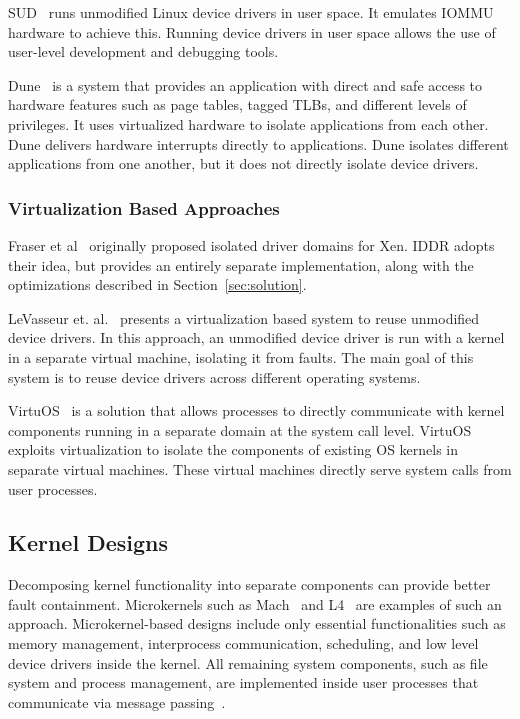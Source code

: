 SUD~\cite{Boyd-Wickizer+:atc2010} runs unmodified Linux device drivers
in user space. It emulates IOMMU hardware to achieve this.
Running device drivers in user space allows the use of user-level
development and debugging tools.

Dune~\cite{Belay+:osdi12} is a system that provides an application with direct
and safe access to hardware features such as page tables, tagged
TLBs, and different levels of privileges. It uses virtualized hardware to isolate
applications from each other. Dune delivers hardware interrupts
directly to applications.
Dune isolates different applications from one another, but 
it does not directly isolate device drivers.

\subsubsection*{Virtualization Based Approaches}

Fraser et al~\cite{Fraser04safehardware} originally proposed
isolated driver domains for Xen.  IDDR adopts their idea, but provides
an entirely separate implementation, along with the optimizations described
in Section~\ref{sec:solution}.

LeVasseur et. al.~\cite{LeVasseur04UnmodifiedDriverReuse} presents
a virtualization based system to reuse unmodified device drivers. 
In this approach, an unmodified device
driver is run with a kernel in a separate virtual machine, isolating
it from faults. The main goal of this system is to reuse device drivers 
across different operating systems. 

VirtuOS~\cite{Nikolaev:2013:VOS:2517349.2522719} is a 
solution that allows processes to directly communicate with kernel
components running in a separate domain at the system call level. 
VirtuOS exploits virtualization to isolate the components of
existing OS kernels in separate virtual machines. 
These virtual machines directly serve system calls from user processes.

\subsection{Kernel Designs}
Decomposing kernel functionality into separate components can provide
better fault containment. 
Microkernels such as Mach~\cite{Accetta+:usenix86} and L4~\cite{Liedtke+:sosp95} 
are examples of such an approach. 
Microkernel-based designs include
only essential functionalities such as memory management, interprocess
communication, scheduling, and low level device drivers inside the kernel.
All remaining system components, such as file system and process
management, are implemented inside user processes that communicate
via message passing~\cite{Elphinstone+:sosp13}.

